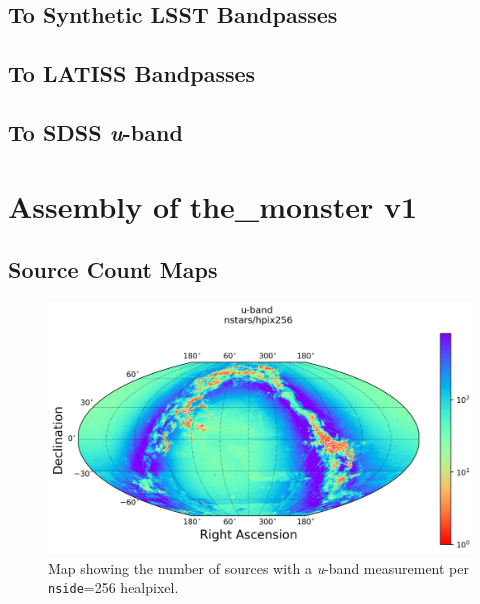 \subsection{To Synthetic LSST Bandpasses}
\subsection{To LATISS Bandpasses}
\subsection{To SDSS \textit{u}-band}

\section{Assembly of the\_monster v1}
\subsection{Source Count Maps}
\begin{figure}
    \centering
    \includegraphics[width=\linewidth]{./figures/source_density_maps/u-band/u-band-counts-full.png}
    \caption{Map showing the number of sources with a \textit{u}-band measurement per \texttt{nside}=256 healpixel.}
    \label{source-counts-u}
\end{figure}


